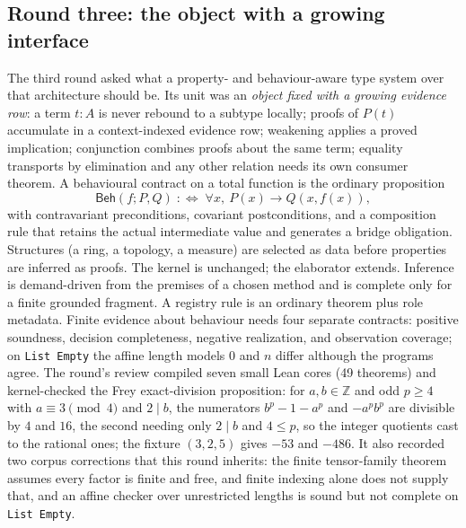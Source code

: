 \documentclass[11pt,a4paper]{article}
\newcommand{\code}[1]{\nolinkurl{#1}}
\newcommand{\Z}{\mathbb Z}
\newcommand{\Beh}{\mathsf{Beh}}
\theoremstyle{definition}
\theoremstyle{plain}
\begin{document}
\subsection{Round three: the object with a growing interface}
The third round asked what a property- and behaviour-aware type system over that architecture should be. Its unit was an \emph{object fixed with a growing evidence row}: a term $t:A$ is never rebound to a subtype locally; proofs of $P(t)$ accumulate in a context-indexed evidence row; weakening applies a proved implication; conjunction combines proofs about the same term; equality transports by elimination and any other relation needs its own consumer theorem. A behavioural contract on a total function is the ordinary proposition
\[
 \Beh(f;P,Q)\;:\!\iff\;\forall x,\ P(x)\to Q(x,f(x)),
\]
with contravariant preconditions, covariant postconditions, and a composition rule that retains the actual intermediate value and generates a bridge obligation. Structures (a ring, a topology, a measure) are selected as data before properties are inferred as proofs. The kernel is unchanged; the elaborator extends. Inference is demand-driven from the premises of a chosen method and is complete only for a finite grounded fragment. A registry rule is an ordinary theorem plus role metadata. Finite evidence about behaviour needs four separate contracts: positive soundness, decision completeness, negative realization, and observation coverage; on \code{List Empty} the affine length models $0$ and $n$ differ although the programs agree. The round's review compiled seven small Lean cores (49 theorems) and kernel-checked the Frey exact-division proposition: for $a,b\in\Z$ and odd $p\ge4$ with $a\equiv3\pmod 4$ and $2\mid b$, the numerators $b^p-1-a^p$ and $-a^pb^p$ are divisible by $4$ and $16$, the second needing only $2\mid b$ and $4\le p$, so the integer quotients cast to the rational ones; the fixture $(3,2,5)$ gives $-53$ and $-486$. It also recorded two corpus corrections that this round inherits: the finite tensor-family theorem assumes every factor is finite and free, and finite indexing alone does not supply that, and an affine checker over unrestricted lengths is sound but not complete on \code{List Empty}.
\end{document}
